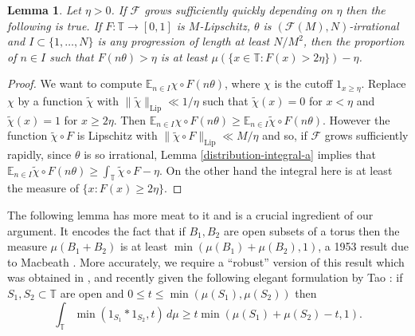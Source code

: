 \documentclass[10pt,reqno]{amsart}
\newtheorem{lemma}[theorem]{Lemma}
\theoremstyle{definition}
\theoremstyle{remark}
\renewcommand{\leq}{\leqslant}
\renewcommand{\geq}{\geqslant}
\newcommand\Lip{\operatorname{Lip}}
\def\E{\mathbb{E}}
\def\T{\mathbb{T}}
\numberwithin{equation}{section}
\begin{document}
\begin{lemma}\label{soft-thresholding}
Let $\eta > 0$. If $\mathcal{F}$ grows sufficiently quickly depending on $\eta$ then the following is true. If $F : \T \rightarrow [0,1]$ is $M$-Lipschitz, $\theta$ is $(\mathcal{F}(M),N)$-irrational and $I \subset \{1,\dots,N\}$ is any progression of length at least $N/M^2$, then the proportion of $n \in I$ such that $F(n\theta) > \eta$ is at least $\mu(\{x \in \T : F(x) > 2\eta\}) - \eta$.
\end{lemma}
\begin{proof}
We want to compute $\E_{n \in I} \chi \circ F(n\theta)$, where $\chi$ is the cutoff $1_{x \geq \eta}$. Replace $\chi$ by a function $\tilde\chi$ with $\| \tilde\chi\|_{\Lip} \ll 1/\eta$ such that $\tilde\chi(x) = 0$ for $x < \eta$ and $\tilde\chi(x) = 1$ for $x \geq 2\eta$. Then $\E_{n \in I} \chi \circ F(n\theta) \geq \E_{n \in I} \tilde\chi \circ F(n\theta)$. However the function $\tilde\chi \circ F$ is Lipschitz with $\| \tilde\chi \circ F\|_{\Lip} \ll M/\eta$ and so, if $\mathcal{F}$ grows sufficiently rapidly, since $\theta$ is so irrational, Lemma \ref{distribution-integral-a} implies that $\E_{n \in I}\tilde\chi \circ F (n\theta) \geq  \int_{\T} \tilde\chi \circ F - \eta$. On the other hand the integral here is at least the measure of $\{x : F(x) \geq 2\eta\}$.
\end{proof}

The following lemma has more meat to it and is a crucial ingredient of our argument. It encodes the fact that if $B_1, B_2$ are open subsets of a torus then the measure $\mu(B_1 + B_2)$ is at least $\min(\mu(B_1) + \mu(B_2),1)$, a 1953 result due to Macbeath \cite{macbeath}. More accurately, we require a ``robust'' version of this result which was obtained in \cite[Proposition 6.1]{green-ruzsa}, and recently given the following elegant formulation by Tao \cite{tao-kemperman}: if $S_1,S_2\subset\T$ are open and $0\leq t\leq\min(\mu(S_1),\mu(S_2))$ then \begin{equation}\label{robustmacbeath}\int_{\T} \min(1_{S_1}\ast 1_{S_2},t)\,d\mu \geq t\min(\mu(S_1) + \mu(S_2) - t, 1).\end{equation}
\end{document}
